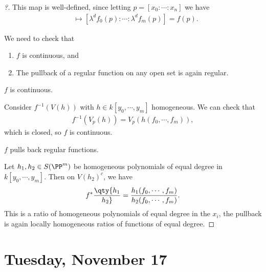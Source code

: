 \begin{proof}[?]

This map is well-defined, since letting \(p = [x_0: \cdots : x_n]\) we
have
\begin{align*}  
[\lambda x_0 : \cdots : \lambda x_n] 
&\mapsto 
[ \lambda^d f_0(p) : \cdots : \lambda^d f_m(p)] 
= f(p)
.\end{align*}

We need to check that

\begin{enumerate}
\def\labelenumi{\arabic{enumi}.}
\item
  \(f\) is continuous, and
\item
  The pullback of a regular function on any open set is again regular.
\end{enumerate}

\begin{claim}

\(f\) is continuous.

\end{claim}

Consider \(f^{-1}(V(h))\) with \(h\in k[y_0, \cdots, y_m]\) homogeneous.
We can check that
\begin{align*}  
f^{-1}(V_p(h)) = V_p(h(f_0, \cdots, f_m))
,\end{align*} which is closed, so \(f\) is continuous.

\begin{claim}

\(f\) pulls back regular functions.

\end{claim}

Let \(h_1, h_2 \in S(\PP^m)\) be homogeneous polynomials of equal degree
in \(k[y_0, \cdots, y_m]\). Then on \(V(h_2)^c\), we have
\begin{align*}  
f^*\qty{h_1 \over h_2 } = {h_1(f_0, \cdots, f_m) \over h_2(f_0, \cdots, f_m)}
.\end{align*} This is a ratio of homogeneous polynomials of equal degree
in the \(x_i\), the pullback is again locally homogeneous ratios of
functions of equal degree.

\end{proof}

\hypertarget{tuesday-november-17}{%
\section{Tuesday, November 17}\label{tuesday-november-17}}

